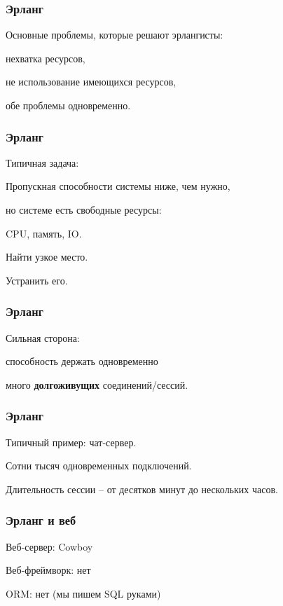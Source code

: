 \documentclass[10pt]{beamer}
\begin{document}
\begin{frame}
\frametitle{Эрланг}
\centering
Основные проблемы, которые решают эрлангисты:
\par \bigskip
нехватка ресурсов,
\par \bigskip
не использование имеющихся ресурсов,
\par \bigskip
обе проблемы одновременно.
\end{frame}

\begin{frame}
\frametitle{Эрланг}
\centering
Типичная задача:
\par \bigskip
Пропускная способности системы ниже, чем нужно,
\par
но системе есть свободные ресурсы:
\par
CPU, память, IO.
\par \bigskip
Найти узкое место.
\par \bigskip
Устранить его.
\end{frame}

\begin{frame}
\frametitle{Эрланг}
\centering
Сильная сторона:
\par \bigskip
способность держать одновременно
\par
много \textbf{долгоживущих} соединений/сессий.
\end{frame}

\begin{frame}
\frametitle{Эрланг}
\centering
Типичный пример: чат-сервер.
\par \bigskip
Сотни тысяч одновременных подключений.
\par \bigskip
Длительность сессии -- от десятков минут до нескольких часов.
\end{frame}

\begin{frame}
\frametitle{Эрланг и веб}
\centering
Веб-сервер: Cowboy
\par \bigskip
Веб-фреймворк: нет
\par \bigskip
ORM: нет (мы пишем SQL руками)
\end{frame}



\end{document}
